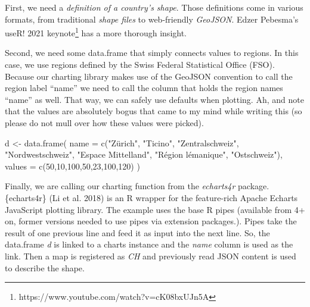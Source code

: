 \documentclass[
  12pt,
  letterpaper,
]{krantz}
\newenvironment{Shaded}{\begin{snugshade}}{\end{snugshade}}
\newcommand{\AttributeTok}[1]{\textcolor[rgb]{0.40,0.45,0.13}{#1}}
\newcommand{\DecValTok}[1]{\textcolor[rgb]{0.68,0.00,0.00}{#1}}
\newcommand{\FunctionTok}[1]{\textcolor[rgb]{0.28,0.35,0.67}{#1}}
\newcommand{\NormalTok}[1]{\textcolor[rgb]{0.00,0.23,0.31}{#1}}
\newcommand{\OtherTok}[1]{\textcolor[rgb]{0.00,0.23,0.31}{#1}}
\newcommand{\StringTok}[1]{\textcolor[rgb]{0.13,0.47,0.30}{#1}}
\begin{document}
First, we need a \emph{definition of a country's shape}. Those
definitions come in various formats, from traditional \emph{shape files}
to web-friendly \emph{GeoJSON}. Edzer Pebesma's useR! 2021
keynote\footnote{https://www.youtube.com/watch?v=cK08bxUJn5A} has a more
thorough insight.

Second, we need some data.frame that simply connects values to regions.
In this case, we use regions defined by the Swiss Federal Statistical
Office (FSO). Because our charting library makes use of the
GeoJSON convention to call the region label ``name'' we
need to call the column that holds the region names ``name'' as well.
That way, we can safely use defaults when plotting. Ah, and note that
the values are absolutely bogus that came to my mind while writing this
(so please do not mull over how these values were picked).

\begin{Shaded}
\begin{Highlighting}[]
\NormalTok{d }\OtherTok{\textless{}{-}} \FunctionTok{data.frame}\NormalTok{(}
  \AttributeTok{name =} \FunctionTok{c}\NormalTok{(}\StringTok{"Zürich"}\NormalTok{,}
           \StringTok{"Ticino"}\NormalTok{,}
           \StringTok{"Zentralschweiz"}\NormalTok{,}
           \StringTok{"Nordwestschweiz"}\NormalTok{,}
           \StringTok{"Espace Mittelland"}\NormalTok{,}
           \StringTok{"Région lémanique"}\NormalTok{,}
           \StringTok{"Ostschweiz"}\NormalTok{),}
  \AttributeTok{values =} \FunctionTok{c}\NormalTok{(}\DecValTok{50}\NormalTok{,}\DecValTok{10}\NormalTok{,}\DecValTok{100}\NormalTok{,}\DecValTok{50}\NormalTok{,}\DecValTok{23}\NormalTok{,}\DecValTok{100}\NormalTok{,}\DecValTok{120}\NormalTok{)}
\NormalTok{)}
\end{Highlighting}
\end{Shaded}

Finally, we are calling our charting function from the \emph{echarts4r}
package. \{echarts4r\} (Li et al. 2018) is an R wrapper for the
feature-rich Apache Echarts JavaScript plotting library. The example
uses the base R pipes (available from 4+ on, former versions needed to
use pipes via extension packages.). Pipes take the result of one
previous line and feed it as input into the next line. So, the
data.frame \emph{d} is linked to a charts instance and the \emph{name}
column is used as the link. Then a map is registered as \emph{CH} and
previously read JSON content is used to describe the shape.
\end{document}
